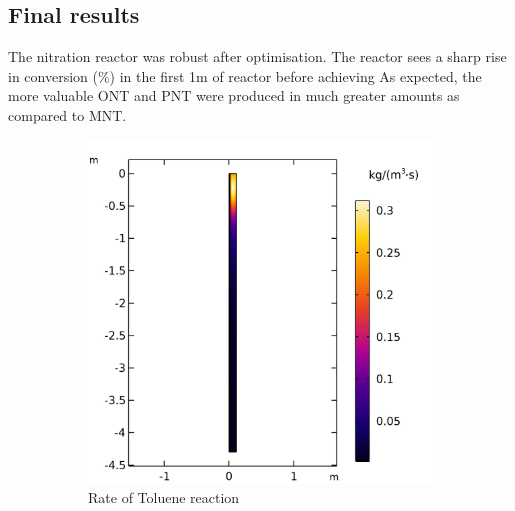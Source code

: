 \subsection{Final results}
The nitration reactor was robust after optimisation. 
The reactor sees a sharp rise in conversion (\%) in the first 1m of reactor before achieving 
As expected, the more valuable ONT and PNT were produced in much greater amounts as compared to MNT. 

\begin{figure}[h]
    \centering

    \begin{subfigure}{0.49\linewidth}
        \includegraphics[width=\linewidth, scale=0.5]{figures/r_TOL.png}
        \caption{Rate of Toluene reaction}
        \label{fig:comsol-performance:r_TOL}
    \end{subfigure}
    \begin{subfigure}{0.49\linewidth}

\end{subfigure}
\end{figure}

